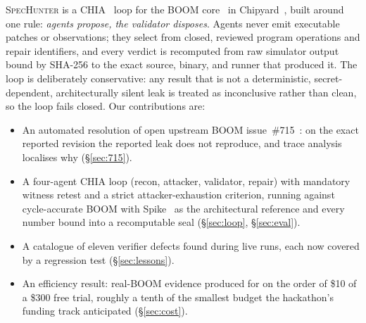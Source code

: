 \documentclass[conference,10pt]{IEEEtran}
\newcommand{\sh}{\textsc{SpecHunter}}
\begin{document}
\sh{} is a CHIA~\cite{chia} loop for the BOOM core~\cite{boom} in
Chipyard~\cite{chipyard}, built around one rule: \emph{agents propose, the
validator disposes}. Agents never emit executable patches or observations;
they select from closed, reviewed program operations and repair identifiers,
and every verdict is recomputed from raw simulator output bound by SHA-256 to
the exact source, binary, and runner that produced it. The loop is deliberately
conservative: any result that is not a deterministic, secret-dependent,
architecturally silent leak is treated as inconclusive rather than clean, so the
loop fails closed. Our contributions are:
\begin{itemize}
\item An automated resolution of open upstream BOOM issue~\#715~\cite{issue715}:
  on the exact reported revision the reported leak does not reproduce, and trace
  analysis localises why (\S\ref{sec:715}).
\item A four-agent CHIA loop (recon, attacker, validator, repair) with
  mandatory witness retest and a strict attacker-exhaustion criterion, running
  against cycle-accurate BOOM with Spike~\cite{spike} as the architectural
  reference and every number bound into a recomputable seal (\S\ref{sec:loop},
  \S\ref{sec:eval}).
\item A catalogue of eleven verifier defects found during live runs, each now
  covered by a regression test (\S\ref{sec:lessons}).
\item An efficiency result: real-BOOM evidence produced for on the order of \$10
  of a \$300 free trial, roughly a tenth of the smallest budget the hackathon's
  funding track anticipated (\S\ref{sec:cost}).
\end{itemize}
\end{document}
